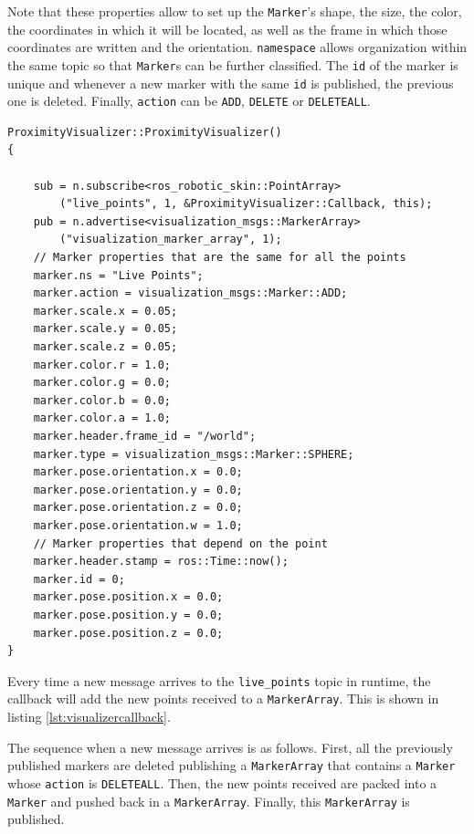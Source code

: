 Note that these properties allow to set up the \lstinline{Marker}'s shape, the size, the color, the coordinates in which it will be located, as well as the frame in which those coordinates are written and the orientation. \lstinline[language=python]{namespace} allows organization within the same topic so that \lstinline{Marker}s can be further classified. The \lstinline{id} of the marker is unique and whenever a new marker with the same \lstinline{id} is published, the previous one is deleted. Finally, \lstinline{action} can be \lstinline{ADD}, \lstinline{DELETE} or \lstinline{DELETEALL}.

\begin{lstlisting}[caption={Initializer of the ProximityVisualizer class},captionpos=b,label={lst:proximityinitializer}]
ProximityVisualizer::ProximityVisualizer()
{

    sub = n.subscribe<ros_robotic_skin::PointArray>
        ("live_points", 1, &ProximityVisualizer::Callback, this);
    pub = n.advertise<visualization_msgs::MarkerArray>
        ("visualization_marker_array", 1);
    // Marker properties that are the same for all the points
    marker.ns = "Live Points";
    marker.action = visualization_msgs::Marker::ADD;
    marker.scale.x = 0.05;
    marker.scale.y = 0.05;
    marker.scale.z = 0.05;
    marker.color.r = 1.0;
    marker.color.g = 0.0;
    marker.color.b = 0.0;
    marker.color.a = 1.0;
    marker.header.frame_id = "/world";
    marker.type = visualization_msgs::Marker::SPHERE;
    marker.pose.orientation.x = 0.0;
    marker.pose.orientation.y = 0.0;
    marker.pose.orientation.z = 0.0;
    marker.pose.orientation.w = 1.0;
    // Marker properties that depend on the point
    marker.header.stamp = ros::Time::now();
    marker.id = 0;
    marker.pose.position.x = 0.0;
    marker.pose.position.y = 0.0;
    marker.pose.position.z = 0.0;
}
\end{lstlisting}

Every time a new message arrives to the \lstinline{live_points} topic in runtime, the callback will add the new points received  to a \lstinline{MarkerArray}. This is shown in listing \ref{lst:visualizercallback}.

The sequence when a new message arrives is as follows. First, all the previously published markers are deleted publishing a \lstinline{MarkerArray} that contains a \lstinline{Marker} whose \lstinline{action} is \lstinline{DELETEALL}. Then, the new points received are packed into a \lstinline{Marker} and pushed back in a \lstinline{MarkerArray}. Finally, this \lstinline{MarkerArray} is published.

